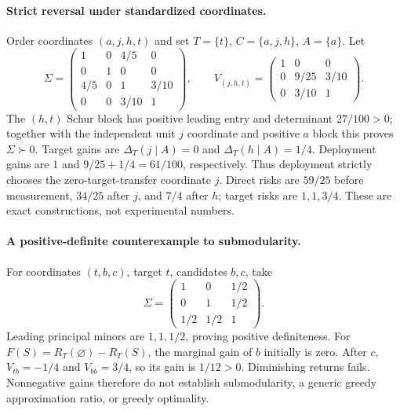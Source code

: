 \documentclass{article}
\begin{document}
\paragraph{Strict reversal under standardized coordinates.}
Order coordinates $(a,j,h,t)$ and set $T=\{t\}$, $C=\{a,j,h\}$, $A=\{a\}$. Let
\begin{equation}
 \Sigma=\begin{pmatrix}1&0&4/5&0\\0&1&0&0\\4/5&0&1&3/10\\0&0&3/10&1\end{pmatrix},\qquad
 V_{(j,h,t)}=\begin{pmatrix}1&0&0\\0&9/25&3/10\\0&3/10&1\end{pmatrix}.
 \label{eq:reversal}
\end{equation}
The $(h,t)$ Schur block has positive leading entry and determinant $27/100>0$; together with the independent unit $j$ coordinate and positive $a$ block this proves $\Sigma\succ0$. Target gains are $\Delta_T(j\mid A)=0$ and $\Delta_T(h\mid A)=1/4$. Deployment gains are $1$ and $9/25+1/4=61/100$, respectively. Thus deployment strictly chooses the zero-target-transfer coordinate $j$. Direct risks are $59/25$ before measurement, $34/25$ after $j$, and $7/4$ after $h$; target risks are $1,1,3/4$. These are exact constructions, not experimental numbers.

\paragraph{A positive-definite counterexample to submodularity.}
For coordinates $(t,b,c)$, target $t$, candidates $b,c$, take
\begin{equation}
 \Sigma=\begin{pmatrix}1&0&1/2\\0&1&1/2\\1/2&1/2&1\end{pmatrix}.
 \label{eq:suppressor}
\end{equation}
Leading principal minors are $1,1,1/2$, proving positive definiteness. For $F(S)=R_T(\varnothing)-R_T(S)$, the marginal gain of $b$ initially is zero. After $c$, $V_{tb}=-1/4$ and $V_{bb}=3/4$, so its gain is $1/12>0$. Diminishing returns fails. Nonnegative gains therefore do not establish submodularity, a generic greedy approximation ratio, or greedy optimality.
\end{document}
